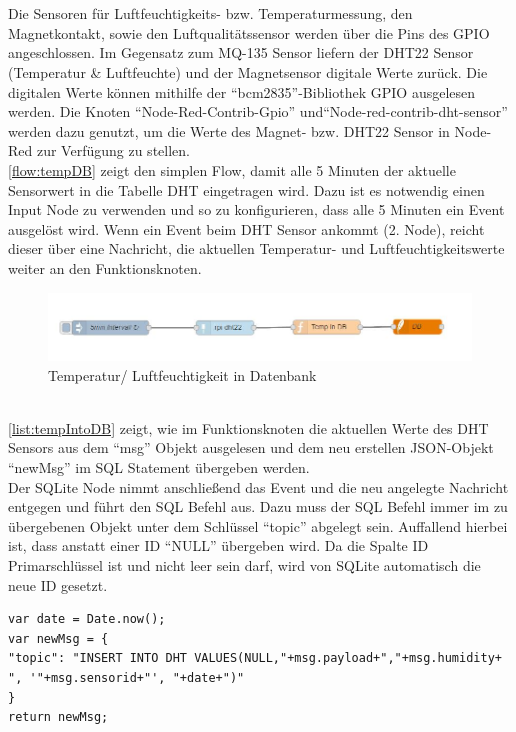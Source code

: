 \\\\
Die Sensoren für Luftfeuchtigkeits- bzw. Temperaturmessung, den Magnetkontakt, sowie den Luftqualitätssensor werden über die Pins des \ac{GPIO} angeschlossen. Im Gegensatz zum MQ-135 Sensor liefern der DHT22 Sensor (Temperatur \& Luftfeuchte) und der Magnetsensor digitale Werte zurück. Die digitalen Werte können mithilfe der \enquote{bcm2835}-Bibliothek \ac{GPIO} ausgelesen werden\cite{bcm:Bcm}. Die Knoten \enquote{Node-Red-Contrib-Gpio}\cite{node:GPIO} und\enquote{Node-red-contrib-dht-sensor}\cite{node:DHT22} werden dazu genutzt, um die Werte des Magnet- bzw. DHT22 Sensor in Node-Red zur Verfügung zu stellen. 
\\
\autoref{flow:tempDB} zeigt den simplen Flow, damit alle 5 Minuten der aktuelle Sensorwert in die Tabelle DHT eingetragen wird. Dazu ist es notwendig einen Input Node zu verwenden und so zu konfigurieren, dass alle 5 Minuten ein Event ausgelöst wird. Wenn ein Event beim DHT Sensor ankommt (2. Node), reicht dieser über eine Nachricht, die aktuellen Temperatur- und Luftfeuchtigkeitswerte weiter an den Funktionsknoten.
\begin{figure}[h]
	\centering
	\includegraphics[scale=0.7]{images/tempIntoDB}
	\caption{Temperatur/ Luftfeuchtigkeit in Datenbank}
	\label{flow:tempDB}
\end{figure}
\\\autoref{list:tempIntoDB} zeigt, wie im Funktionsknoten die aktuellen Werte des DHT Sensors aus dem \enquote{msg} Objekt ausgelesen und dem neu erstellen \ac{JSON}-Objekt \enquote{newMsg} im \ac{SQL} Statement übergeben werden. \\Der SQLite Node nimmt anschließend das Event und die neu angelegte Nachricht entgegen und führt den \ac{SQL} Befehl  aus. Dazu muss der \ac{SQL} Befehl immer im zu übergebenen Objekt unter dem Schlüssel \enquote{topic} abgelegt sein. Auffallend hierbei ist, dass anstatt einer ID \enquote{NULL} übergeben wird. Da die Spalte ID Primarschlüssel ist und nicht leer sein darf, wird von SQLite automatisch die neue ID gesetzt.
\begin{lstlisting}[label=list:tempIntoDB, caption={Neuer Eintrag in Tabelle DHT}]
var date = Date.now();
var newMsg = {
"topic": "INSERT INTO DHT VALUES(NULL,"+msg.payload+","+msg.humidity+ ", '"+msg.sensorid+"', "+date+")"
}
return newMsg;
\end{lstlisting}
